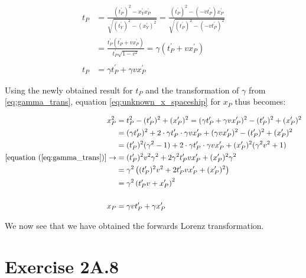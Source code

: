 \documentclass[a4paper,10pt,english]{article}
\begin{document}
\begin{enumerate}
\begin{align*}
t_{P}&=\frac{(t_{P}^{\prime})^{2}-x_{Y}^{\prime}x_{P}^{\prime}}{\sqrt{(t_{Y}^{\prime})^2-(x_{Y}^{\prime})^2}}=\frac{(t_{P}^{\prime})^{2}-(-vt_{P}^{\prime})x_{P}^{\prime}}{\sqrt{(t_{P}^{\prime})^2-(-vt_{P}^{\prime})^2}}\\
&=\frac{t_{P}^{\prime}\left(t_{P}^{\prime}+vx_{P}^{\prime}\right)}{t_{P}^{\prime}\sqrt{1-v^2}}=\gamma(t_{P}^{\prime}+vx_{P}^{\prime})\\
\\
t_{P}&=\gamma t_{P}^{\prime}+\gamma vx_{P}^{\prime}
\end{align*}

Using the newly obtained result for $t_{P}$ and the transformation of $\gamma$ from \ref{eq:gamma_trans}, equation \ref{eq:unknown_x_spaceship} for $x_{P}$ thus becomes:

\begin{align*}
x_{P}^{2}&=t_{P}^{2}-(t^{\prime}_{P})^{2}+(x^{\prime}_{P})^{2}=(\gamma t_{P}^{\prime}+\gamma vx_{P}^{\prime})^{2}-(t^{\prime}_{P})^{2}+(x^{\prime}_{P})^{2}\\
&=(\gamma t_{P}^{\prime})^{2}+2\cdot\gamma t_{P}^{\prime}\cdot\gamma vx_{P}^{\prime}+(\gamma vx_{P}^{\prime})^{2}-(t^{\prime}_{P})^{2}+(x^{\prime}_{P})^{2}\\
&=(t^{\prime}_{P})^{2}(\gamma^{2}-1)+2\cdot\gamma t_{P}^{\prime}\cdot\gamma vx_{P}^{\prime}+(x^{\prime}_{P})^{2}(\gamma^{2}v^{2}+1)\\
[\text{equation }(\ref{eq:gamma_trans})]\rightarrow&=(t^{\prime}_{P})^{2}v^{2}\gamma^{2}+2\gamma^{2}t_{P}^{\prime}vx_{P}^{\prime}+(x^{\prime}_{P})^{2}\gamma^{2}\\
&=\gamma^{2}\left((t^{\prime}_{P})^{2}v^{2}+2t_{P}^{\prime}vx_{P}^{\prime}+(x^{\prime}_{P})^{2}\right)\\
&=\gamma^{2}\left(t^{\prime}_{P}v+x^{\prime}_{P}\right)^{2}\\
\\
x_{P}&=\gamma vt^{\prime}_{P}+\gamma x^{\prime}_{P}
\end{align*}

We now see that we have obtained the forwards Lorenz transformation.

\end{enumerate}









\section*{Exercise 2A.8}
\end{document}
